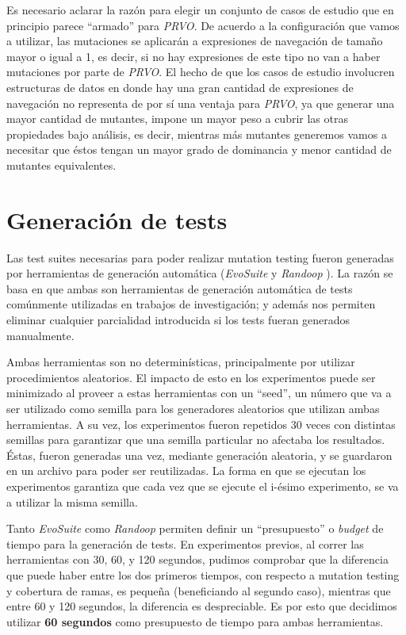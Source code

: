 Es necesario aclarar la raz\'on para elegir un conjunto de casos de estudio que en principio parece ``armado'' para \emph{PRVO}. De acuerdo a la configuraci\'on que vamos a utilizar, las mutaciones se aplicar\'an a expresiones de navegaci\'on de tama\~no mayor o igual a 1, es decir, si no hay expresiones de este tipo no van a haber mutaciones por parte de \emph{PRVO}. El hecho de que los casos de estudio involucren estructuras de datos en donde hay una gran cantidad de expresiones de navegaci\'on no representa de por s\'i una ventaja para \emph{PRVO}, ya que generar una mayor cantidad de mutantes, impone un mayor peso a cubrir las otras propiedades bajo an\'alisis, es decir, mientras m\'as mutantes generemos vamos a necesitar que \'estos tengan un mayor grado de dominancia y menor cantidad de mutantes equivalentes.

\section{Generaci\'on de tests}
\label{sec:evaluation.tests}

Las test suites necesarias para poder realizar mutation testing fueron generadas por herramientas de generaci\'on autom\'atica (\emph{EvoSuite} \cite{bibliography.testing.generation.EvoSuiteFraserA11} y \emph{Randoop} \cite{bibliography.testing.generation.RandoopPachecoE07}). La raz\'on se basa en que ambas son herramientas de generaci\'on autom\'atica de tests com\'unmente utilizadas en trabajos de investigaci\'on; y adem\'as nos permiten eliminar cualquier parcialidad introducida si los tests fueran generados manualmente.

Ambas herramientas son no determin\'isticas, principalmente por utilizar procedimientos aleatorios. El impacto de esto en los experimentos puede ser minimizado al proveer a estas herramientas con un ``seed'', un n\'umero que va a ser utilizado como semilla para los generadores aleatorios que utilizan ambas herramientas. A su vez, los experimentos fueron repetidos 30 veces con distintas semillas para garantizar que una semilla particular no afectaba los resultados. \'Estas, fueron generadas una vez, mediante generaci\'on aleatoria, y se guardaron en un archivo para poder ser reutilizadas. La forma en que se ejecutan los experimentos garantiza que cada vez que se ejecute el i-\'esimo experimento, se va a utilizar la misma semilla.

Tanto \emph{EvoSuite} como \emph{Randoop} permiten definir un ``presupuesto'' o \emph{budget} de tiempo para la generaci\'on de tests. En experimentos previos, al correr las herramientas con 30, 60, y 120 segundos, pudimos comprobar que la diferencia que puede haber entre los dos primeros tiempos, con respecto a mutation testing y cobertura de ramas, es peque\~na (beneficiando al segundo caso), mientras que entre 60 y 120 segundos, la diferencia es despreciable. Es por esto que decidimos utilizar \textbf{60 segundos} como presupuesto de tiempo para ambas herramientas.

